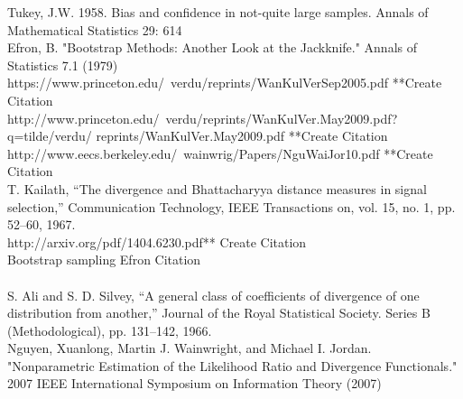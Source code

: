 \documentclass{article}
\begin{document}
	\noindent [9] Tukey, J.W. 1958. Bias and confidence in not-quite large samples. Annals of Mathematical 
	\indent Statistics 29: 614
	\\ [0.5ex]
	
	\noindent [10] Efron, B. "Bootstrap Methods: Another Look at the Jackknife." Annals of Statistics 7.1 (1979)
	\\ [0.5ex]
	
	\noindent [11] https://www.princeton.edu/~verdu/reprints/WanKulVerSep2005.pdf **Create Citation
	\\ [0.5ex]
	
	\noindent [12] http://www.princeton.edu/~verdu/reprints/WanKulVer.May2009.pdf?q=tilde/verdu/
	\indent reprints/WanKulVer.May2009.pdf **Create Citation
	\\ [0.5ex]
	
	\noindent [13] http://www.eecs.berkeley.edu/~wainwrig/Papers/NguWaiJor10.pdf **Create Citation
	\\ [0.5ex]
	
	\noindent [14] T. Kailath, “The divergence and Bhattacharyya distance measures in signal selection,” Communication 
	\indent Technology, IEEE Transactions on, vol. 15, no. 1, pp. 52–60, 1967.
	\\ [0.5ex]

	
	\noindent [16] http://arxiv.org/pdf/1404.6230.pdf** Create Citation
	\\ [0.5ex]
	
	\noindent [17] Bootstrap sampling Efron Citation
	\\ [0.5ex]
	
	\noindent [18]
	\\ [0.5ex]
	
	\noindent [19] S. Ali and S. D. Silvey, “A general class of coefficients of divergence of one distribution from 
	\indent another,” Journal of the Royal Statistical Society.
	Series B (Methodological), pp. 131–142, 1966.
	\\ [0.5ex]
	
	\noindent [20] Nguyen, Xuanlong, Martin J. Wainwright, and Michael I. Jordan. "Nonparametric Estimation 
	\indent of the Likelihood Ratio and Divergence Functionals." 2007 IEEE International Symposium on 
	\indent Information Theory (2007)
	\\ [0.5ex]
\end{document}
